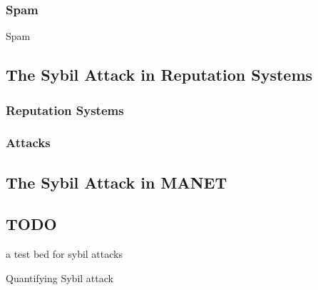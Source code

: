 \subsubsection{Spam}
Spam \cite{facebookspam}

\subsection{The Sybil Attack in Reputation Systems}

\subsubsection{Reputation Systems}
\subsubsection{Attacks}

\subsection{The Sybil Attack in MANET}

\subsection{TODO}
a test bed for sybil attacks\cite{irissappane2012towards}

Quantifying Sybil attack\cite{margolin2008quantifying}

